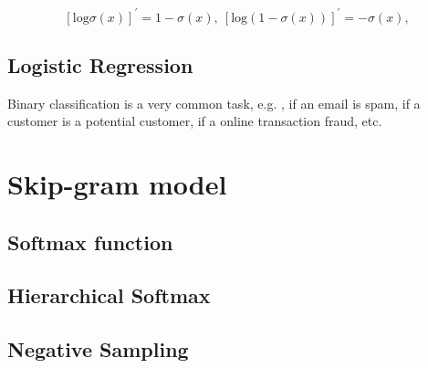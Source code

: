 $$ [\mathrm{log}\sigma(x)]^\prime = 1-\sigma(x), \ [\mathrm{log}(1-\sigma(x))]^\prime = -\sigma(x), $$

\subsection{Logistic Regression}

Binary classification is a very common task, e.g. , if an email is spam, if a customer is a potential customer, if a online transaction fraud, etc. 


\section{Skip-gram model}


\subsection{Softmax function}


\subsection{Hierarchical Softmax}


\subsection{Negative Sampling}

